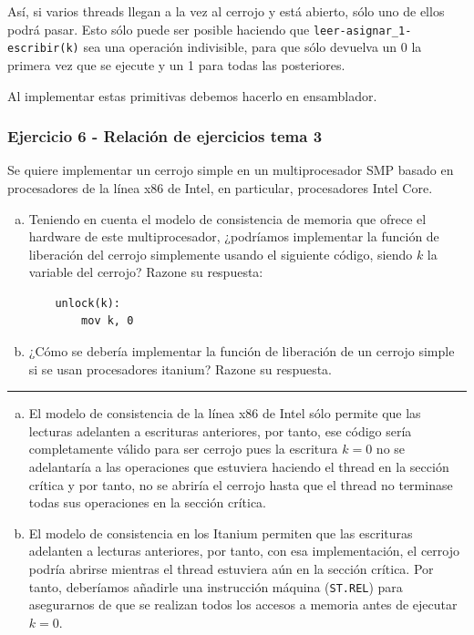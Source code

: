 \documentclass[10pt,a4paper,spanish]{report}
\begin{document}
Así, si varios threads llegan a la vez al cerrojo y está abierto, sólo uno de ellos podrá pasar. Esto sólo puede ser posible haciendo que \verb*|leer-asignar_1-escribir(k)| sea una operación indivisible, para que sólo devuelva un 0 la primera vez que se ejecute y un 1 para todas las posteriores.

Al implementar estas primitivas debemos hacerlo en ensamblador.

\textcolor{azul}{\subsubsection{Ejercicio 6 - Relación de ejercicios tema 3}}
Se quiere implementar un cerrojo simple en un multiprocesador SMP basado en procesadores de la línea x86 de Intel, en particular, procesadores Intel Core.
\begin{enumerate}[a)]
    \item Teniendo en cuenta el modelo de consistencia de memoria que ofrece el hardware de este multiprocesador, ¿podríamos implementar la función de liberación del cerrojo simplemente usando el siguiente código, siendo $k$ la variable del cerrojo? Razone su respuesta:
    \begin{verbatim}
    unlock(k):
        mov k, 0
    \end{verbatim}
    \item ¿Cómo se debería implementar la función de liberación de un cerrojo simple si se usan procesadores itanium? Razone su respuesta.
\end{enumerate}

\rule{\linewidth}{0.05mm}

\begin{enumerate}[a)]
    \item El modelo de consistencia de la línea x86 de Intel sólo permite que las lecturas adelanten a escrituras anteriores, por tanto, ese código sería completamente válido para ser cerrojo pues la escritura $k = 0$ no se adelantaría a las operaciones que estuviera haciendo el thread en la sección crítica y por tanto, no se abriría el cerrojo hasta que el thread no terminase todas sus operaciones en la sección crítica.

    \item El modelo de consistencia en los Itanium permiten que las escrituras adelanten a lecturas anteriores, por tanto, con esa implementación, el cerrojo podría abrirse mientras el thread estuviera aún en la sección crítica. Por tanto, deberíamos añadirle una instrucción máquina (\verb*|ST.REL|) para asegurarnos de que se realizan todos los accesos a memoria antes de ejecutar $k=0$.
\end{enumerate}
\end{document}
